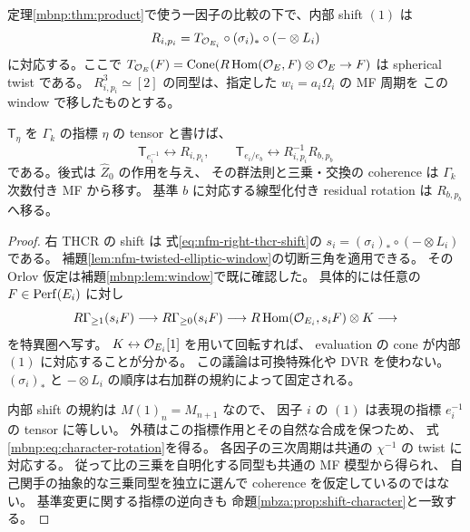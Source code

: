 \begin{proposition}
\label{mbnp:prop:rotations}
定理\ref{mbnp:thm:product}で使う一因子の比較の下で、内部 shift $(1)$ は
\begin{equation}\label{mbnp:eq:factor-rotation}
 R_{i,p_i}=T_{\mathcal O_{E_i}}\circ(\sigma_i)_*\circ(-\otimes L_i)
\end{equation}
に対応する。ここで
$T_{\mathcal O_E}(F)=\operatorname{Cone}(R\operatorname{Hom}(\mathcal O_E,F)\otimes\mathcal O_E\to F)$
は spherical twist である。
$R_{i,p_i}^3\simeq[2]$ の同型は、指定した $w_i=a_i\Omega_i$ の MF 周期を
この window で移したものとする。

$\mathsf T_\eta$ を $\Gamma_k$ の指標 $\eta$ の tensor と書けば、
\begin{equation}\label{mbnp:eq:character-rotation}
 \mathsf T_{e_i^{-1}}\longleftrightarrow R_{i,p_i},\qquad
 \mathsf T_{e_i/e_b}\longleftrightarrow R_{i,p_i}^{-1}R_{b,p_b}
\end{equation}
である。後式は $\widehat Z_0$ の作用を与え、
その群法則と三乗・交換の coherence は $\Gamma_k$ 次数付き MF から移す。
基準 $b$ に対応する線型化付き residual rotation は $R_{b,p_b}$ へ移る。
\end{proposition}
\begin{proof}
右 THCR の shift は
式\eqref{eq:nfm-right-thcr-shift}の
$s_i=(\sigma_i)_*\circ(-\otimes L_i)$ である。
補題\ref{lem:nfm-twisted-elliptic-window}の切断三角を適用できる。
その Orlov 仮定は補題\ref{mbnp:lem:window}で既に確認した。
具体的には任意の $F\in\operatorname{Perf}(E_i)$ に対し
\[
 R\Gamma_{\geq1}(s_iF)\longrightarrow
 R\Gamma_{\geq0}(s_iF)\longrightarrow
 R\operatorname{Hom}(\mathcal O_{E_i},s_iF)\otimes K\longrightarrow
\]
を特異圏へ写す。
$K\leftrightarrow\mathcal O_{E_i}[1]$ を用いて回転すれば、
evaluation の cone が内部 $(1)$ に対応することが分かる。
この議論は可換特殊化や DVR を使わない。
$(\sigma_i)_*$ と $-\otimes L_i$ の順序は右加群の規約によって固定される。

内部 shift の規約は $M(1)_n=M_{n+1}$ なので、
因子 $i$ の $(1)$ は表現の指標 $e_i^{-1}$ の tensor に等しい。
外積はこの指標作用とその自然な合成を保つため、
式\eqref{mbnp:eq:character-rotation}を得る。
各因子の三次周期は共通の $\chi^{-1}$ の twist に対応する。
従って比の三乗を自明化する同型も共通の MF 模型から得られ、
自己関手の抽象的な三乗同型を独立に選んで coherence を仮定しているのではない。
基準変更に関する指標の逆向きも
命題\ref{mbza:prop:shift-character}と一致する。
\end{proof}

